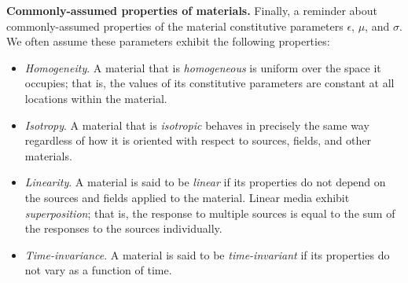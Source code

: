 {\bf Commonly-assumed properties of materials.}
Finally, a reminder about commonly-assumed properties of the material constitutive parameters $\epsilon$, $\mu$, and $\sigma$.
We often assume these parameters exhibit the following properties: 
%
\begin{itemize}
\item \emph{Homogeneity}. 
A material that is {\it homogeneous} 
is uniform over the space it occupies; that is, the values of its constitutive parameters are constant at all locations within the material. 
\item \emph{Isotropy}.  
A material that is {\it isotropic} 
behaves in precisely the same way regardless of how it is oriented with respect to sources, fields, and other materials.  
\item \emph{Linearity}.
A material is said to be {\it linear} if its properties do not depend on the sources and fields applied to the material.  
Linear media exhibit \emph{superposition};
that is, the response to multiple sources is equal to the sum of the responses to the sources individually.
\item \emph{Time-invariance}. 
A material is said to be \emph{time-invariant} if its properties do not vary as a function of time.  
\end{itemize}

